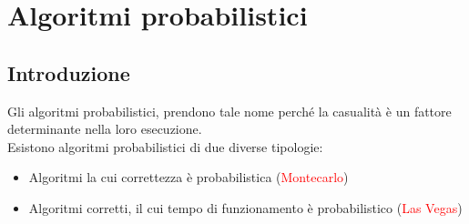 \documentclass[../cheatSheetAlgoritmi.tex]{subfiles}
\begin{document}
\chapter{Algoritmi probabilistici}
\section{Introduzione}
Gli algoritmi probabilistici, prendono tale nome perché la casualità è un fattore determinante nella loro esecuzione. \\
Esistono algoritmi probabilistici di due diverse tipologie:
\begin{itemize}
	\item Algoritmi la cui correttezza è probabilistica (\textcolor{red}{Montecarlo})
	\item Algoritmi corretti, il cui tempo di funzionamento è probabilistico (\textcolor{red}{Las Vegas})
\end{itemize}
\end{document}
